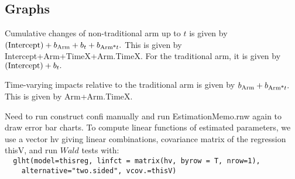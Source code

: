\subsection{Graphs}

Cumulative changes of non-traditional arm up to $t$ is given by $\mbox{(Intercept)}+b_{\mbox{\scriptsize Arm}}+b_{\mbox{\scriptsize $t$}}+b_{\mbox{\scriptsize Arm*$t$}}.$  This is given by \textsf{Intercept+Arm+TimeX+Arm.TimeX}. For the traditional arm, it is given by $\mbox{(Intercept)}+b_{\mbox{\scriptsize $t$}}.$

Time-varying impacts relative to the traditional arm is given by $b_{\mbox{\scriptsize Arm}}+b_{\mbox{\scriptsize Arm*$t$}}.$ This is given by \textsf{Arm+Arm.TimeX}. 


Need to run construct confi manually and run EstimationMemo.rnw again to draw error bar charts. To compute linear functions of estimated parameters, we use a vector \textsf{hv} giving linear combinations, covariance matrix of the regression \textsf{thisV}, and run $Wald$ tests with:\\
{\verb+  glht(model=thisreg, linfct = matrix(hv, byrow = T, nrow=1),+ \\
\verb+    alternative="two.sided", vcov.=thisV)+}



